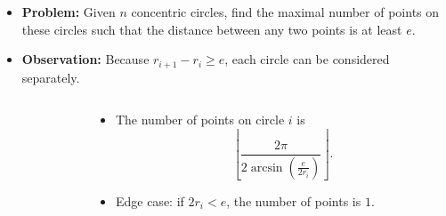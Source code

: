 \begin{frame}
    \frametitle{\problemtitle}
    \begin{itemize}
        \item<+-> \textbf{Problem:} Given $n$ concentric circles,
        	find the maximal number of points on these circles
        	such that the distance between any two points is at least $e$.
        \item<+-> \textbf{Observation:} Because $r_{i+1}-r_i \geq e$,
        	each circle can be considered separately.
    \end{itemize}
    \vspace{-1.5em}

    \begin{columns}
    \begin{column}{0.0\textwidth}
    \end{column}
    \begin{column}{0.7\textwidth}
    \begin{itemize}
        \item<+-> The number of points on circle $i$ is
        	\[\left\lfloor\frac{2\pi}{2\arcsin(\frac{e}{2r_i})}\right\rfloor.\]
        \item<+-> Edge case: if $2r_i < e$, the number of points is $1$.


\end{itemize}
\end{column}
\end{columns}
\end{frame}

